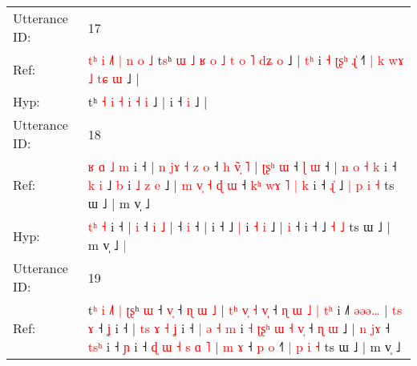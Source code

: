 \documentclass[10pt]{article}
\DeclareRobustCommand{\hl}[1]{{\textcolor{red}{#1}}}
\begin{document}
\begin{longtable}{ll}
 \\
\midrule
Utterance ID: & 17 \\
Ref: & \hl{t}\hl{ʰ}\hl{ }\hl{i}\hl{ }\hl{˩}\hl{˥}\hl{ }\hl{|}\hl{ }\hl{n}\hl{ }\hl{o}\hl{ }\hl{˩}\hl{ }t\hl{s}ʰ\hl{ }\hl{ɯ}\hl{ }\hl{˩}\hl{ }\hl{ʁ}\hl{ }\hl{o} \hl{˩} \hl{t} \hl{o} \hl{˥} \hl{d}\hl{ʑ} \hl{o} ˩ |\hl{ }\hl{t}\hl{ʰ} i\hl{ }\hl{˧}\hl{ }\hl{ʈ}\hl{ʂ}\hl{ʰ}\hl{ }\hl{ɻ}\hl{̍} ˧\hl{˥}\hl{ }\hl{|}\hl{ }\hl{k}\hl{ }\hl{w}\hl{ɤ}\hl{ }\hl{˩}\hl{ }\hl{t}\hl{ɕ} \hl{ɯ} ˩ |
 \\
Hyp: & \hl{}\hl{}\hl{}\hl{}\hl{}\hl{}\hl{}\hl{}\hl{}\hl{}\hl{}\hl{}\hl{}\hl{}\hl{}\hl{}t\hl{}ʰ\hl{}\hl{}\hl{}\hl{}\hl{}\hl{}\hl{}\hl{} \hl{˧} \hl{i} \hl{˧} \hl{i} \hl{}\hl{˧} \hl{i} ˩ |\hl{}\hl{}\hl{} i\hl{}\hl{}\hl{}\hl{}\hl{}\hl{}\hl{}\hl{}\hl{} ˧\hl{}\hl{}\hl{}\hl{}\hl{}\hl{}\hl{}\hl{}\hl{}\hl{}\hl{}\hl{}\hl{} \hl{i} ˩ |
 \\
\midrule
Utterance ID: & 18 \\
Ref: & \hl{ʁ}\hl{ }\hl{ɑ}\hl{ }\hl{˩} \hl{m} i ˧ |\hl{ }\hl{n}\hl{ }\hl{j}\hl{ɤ}\hl{ }\hl{˧}\hl{ }\hl{z} \hl{o} ˧\hl{ }\hl{h} \hl{v}\hl{̃}\hl{̩} \hl{˥} |\hl{ }\hl{ʈ}\hl{ʂ}\hl{ʰ}\hl{ }\hl{ɯ} ˧\hl{ }\hl{ɭ} \hl{ɯ} ˧ |\hl{ }\hl{n}\hl{ }\hl{o}\hl{ }\hl{˧}\hl{ }\hl{k} i ˧\hl{ }\hl{k}\hl{ }\hl{i} ˩ \hl{b} i\hl{ }\hl{˩} \hl{z} \hl{e} ˩ |\hl{ }\hl{m}\hl{ }\hl{v}\hl{̩}\hl{ }\hl{˧}\hl{ }\hl{ɖ} \hl{ɯ} ˧\hl{ }\hl{k}\hl{ʰ}\hl{ }\hl{w}\hl{ɤ}\hl{ }\hl{˥}\hl{ }\hl{|}\hl{ }\hl{k} i ˧\hl{ }\hl{ɻ}\hl{̍} ˩\hl{ }\hl{|}\hl{ }\hl{p} \hl{i} \hl{˧} ts ɯ ˩ | m v̩ ˩\hl{}\hl{}
 \\
Hyp: & \hl{}\hl{}\hl{}\hl{t}\hl{ʰ} \hl{˧} i ˧ |\hl{}\hl{}\hl{}\hl{}\hl{}\hl{}\hl{}\hl{}\hl{} \hl{i} ˧\hl{}\hl{} \hl{}\hl{}\hl{i} \hl{˩} |\hl{}\hl{}\hl{}\hl{}\hl{}\hl{} ˧\hl{}\hl{} \hl{i} ˧ |\hl{}\hl{}\hl{}\hl{}\hl{}\hl{}\hl{}\hl{} i ˧\hl{}\hl{}\hl{}\hl{} ˩ \hl{|} i\hl{}\hl{} \hl{˧} \hl{i} ˩ |\hl{}\hl{}\hl{}\hl{}\hl{}\hl{}\hl{}\hl{}\hl{} \hl{i} ˧\hl{}\hl{}\hl{}\hl{}\hl{}\hl{}\hl{}\hl{}\hl{}\hl{}\hl{}\hl{} i ˧\hl{}\hl{}\hl{} ˩\hl{}\hl{}\hl{}\hl{} \hl{˧} \hl{˩} ts ɯ ˩ | m v̩ ˩\hl{ }\hl{|}
 \\
\midrule
Utterance ID: & 19 \\
Ref: & t\hl{ʰ}\hl{ }\hl{i}\hl{ }\hl{˩}\hl{˥}\hl{ }\hl{|}\hl{ }\hl{ʈ}\hl{ʂ}ʰ\hl{ }\hl{ɯ} ˧ \hl{v}\hl{̩} ˧\hl{ }\hl{ɳ}\hl{ }\hl{ɯ}\hl{ }\hl{˩} |\hl{ }\hl{t}\hl{ʰ}\hl{ }\hl{v}\hl{̩}\hl{ }\hl{˧} \hl{v}\hl{̩} ˧\hl{ }\hl{ɳ}\hl{ }\hl{ɯ}\hl{ }\hl{˩}\hl{ }\hl{|}\hl{ }\hl{t}\hl{ʰ} i ˩\hl{˥}\hl{ }\hl{ə}\hl{ə}\hl{ə}\hl{…} |\hl{ }\hl{t}\hl{s}\hl{ }\hl{ɤ} ˧\hl{ }\hl{ʝ} i ˧ |\hl{ }\hl{t}\hl{s}\hl{ }\hl{ɤ}\hl{ }\hl{˧}\hl{ }\hl{ʝ} i ˧\hl{ }\hl{|} \hl{ə} \hl{˧} \hl{m} i\hl{ }\hl{˧}\hl{ }\hl{ʈ}\hl{ʂ}\hl{ʰ}\hl{ }\hl{ɯ}\hl{ }\hl{˧}\hl{ }\hl{v}\hl{̩} ˧\hl{ }\hl{ɳ} \hl{ɯ} ˩ |\hl{ }\hl{n}\hl{ }\hl{j}\hl{ɤ} ˧ \hl{t}\hl{s}\hl{ʰ} i ˧ \hl{ɲ} i ˧ \hl{ɖ} \hl{ɯ} \hl{˧} \hl{s} \hl{ɑ} \hl{˥} |\hl{ }\hl{m} \hl{ɤ} ˧\hl{ }\hl{p} \hl{o} ˧\hl{˥}\hl{ }\hl{|}\hl{ }\hl{p}\hl{ }\hl{i} \hl{˧} ts ɯ ˩ | m v̩ ˩\hl{}\hl{}

\end{longtable}
\end{document}

